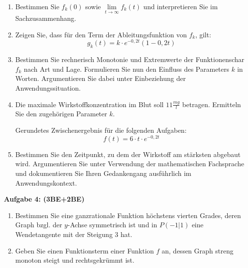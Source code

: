 \documentclass[a4paper,12pt]{article}
\newcommand{\Aufgabe}[1]{
  {
  \vspace*{0.5cm}
  \textsf{\textbf{Aufgabe #1}}
  \vspace*{0.2cm}
  
  }
}
\begin{document}
\begin{enumerate}[label={\alph*)}]
  \item Bestimmen Sie $f_k(0)$ sowie $\lim \limits_{t \to \infty} f_k(t)$ und interpretieren Sie im Sachzusammenhang.
  \item Zeigen Sie, dass für den Term der Ableitungsfunktion von $f_k$, gilt: 
    \[g_k (t) = k \cdot e^{-0,2t} (1-0,2t) \]
  \item Bestimmen Sie rechnerisch Monotonie und Extremwerte der Funktionenschar $f_k$ nach Art und Lage. 
    Formulieren Sie nun den Einfluss des Parameters $k$ in Worten. Argumentieren Sie dabei unter Einbeziehung der Anwendungssituation.
  \item Die maximale Wirkstoffkonzentration im Blut soll $11\frac{mg}{l}$ betragen. Ermitteln Sie den zugehörigen Parameter $k$.

Gerundetes Zwischenergebnis für die folgenden Aufgaben: 
\[ f(t)=6 \cdot t \cdot e^{-0,2t} \]


  \item Bestimmen Sie den Zeitpunkt, zu dem der Wirkstoff am stärksten abgebaut wird. Argumentieren Sie unter Verwendung der mathematischen Fachsprache und dokumentieren Sie Ihren Gedankengang ausführlich im Anwendungskontext.
\end{enumerate}

\newpage
\Aufgabe{4: (3BE+2BE)} 
\begin{enumerate}[label={\alph*)}] 
  \item Bestimmen Sie eine ganzrationale Funktion höchstens vierten Grades, deren Graph bzgl. der $y$-Achse symmetrisch ist und in $P (-1|1)$ eine Wendetangente mit der Steigung 3 hat.
  \item Geben Sie einen Funktionsterm einer Funktion $f$ an, dessen Graph streng monoton steigt und rechtsgekrümmt ist.
\end{enumerate}


\end{document}
